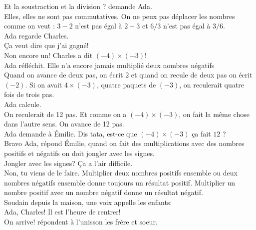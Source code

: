 \mdash Et la soustraction et la division ? demande Ada.\\
\mdash Elles, elles ne sont pas commutatives. On ne peux pas déplacer les nombres comme on veut : $3 - 2$ n'est pas égal à $2 - 3$ et $6/3$ n'est pas égal à $3/6$. \guillemotright\\
Ada regarde Charles.\\
\guillemotleft Ça veut dire que j'ai gagné!\\
\mdash Non encore un! Charles a dit $(-4) \times (-3)$!\guillemotright\\
Ada réfléchit. Elle n'a encore jamais multiplié deux nombres négatifs\\
\guillemotleft Quand on avance de deux pas, on écrit $2$ et quand on recule de deux pas on écrit $(-2)$. Si on avait $4 \times (-3)$, quatre paquets de $(-3)$, on reculerait quatre fois de trois pas.\guillemotright\\
Ada calcule. \\
\guillemotleft On reculerait de 12 pas. Et comme on a $(-4) \times (-3)$, on fait la même chose dans l'autre sens. On avance de 12 pas.\guillemotright\\
Ada demande à Émilie. 
\guillemotleft Dis tata, est-ce que $(-4) \times (-3)$ ça fait $12$ ?\\
\mdash Bravo Ada, répond Émilie, quand on fait des multiplications avec des nombres positifs et négatifs on doit jongler avec les signes.\\
\mdash Jongler avec les signes? Ça a l'air difficile.\\
\mdash Non, tu viens de le faire. Multiplier deux nombres positifs ensemble ou deux nombres négatifs ensemble donne toujours un résultat positif. Multiplier un nombre positif avec un nombre négatif donne un résultat négatif.\guillemotright\\
Soudain depuis la maison, une voix appelle les enfants:\\
\guillemotleft Ada, Charles! Il est l'heure de rentrer!\\
\mdash On arrive! répondent à l'unisson les frère et soeur.\guillemotright\\